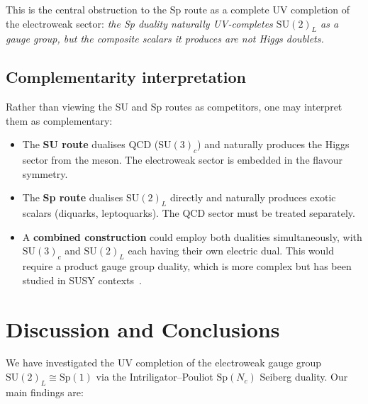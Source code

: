 \documentclass[11pt,a4paper]{article}
\theoremstyle{plain}
\theoremstyle{definition}
\theoremstyle{remark}
\newcommand{\Nc}{N_{\!c}}
\newcommand{\SU}[1]{\mathrm{SU}(#1)}
\newcommand{\Sp}[1]{\mathrm{Sp}(#1)}
\begin{document}
This is the central obstruction to the Sp route as a complete
UV completion of the electroweak sector: \emph{the Sp duality
naturally UV-completes $\SU{2}_L$ as a gauge group, but the
composite scalars it produces are not Higgs doublets.}

\subsection{Complementarity interpretation}

Rather than viewing the SU and Sp routes as competitors, one may
interpret them as complementary:
\begin{itemize}
  \item The \textbf{SU route} dualises QCD ($\SU{3}_c$) and
    naturally produces the Higgs sector from the meson.  The
    electroweak sector is embedded in the flavour symmetry.
  \item The \textbf{Sp route} dualises $\SU{2}_L$ directly and
    naturally produces exotic scalars (diquarks, leptoquarks).
    The QCD sector must be treated separately.
  \item A \textbf{combined construction} could employ both dualities
    simultaneously, with $\SU{3}_c$ and $\SU{2}_L$ each having their
    own electric dual.  This would require a product gauge group
    duality, which is more complex but has been studied in SUSY
    contexts~\cite{IS1995}.
\end{itemize}


\section{Discussion and Conclusions}
\label{sec:conclusions}

We have investigated the UV completion of the electroweak gauge group
$\SU{2}_L \cong \Sp{1}$ via the Intriligator--Pouliot $\Sp{\Nc}$
Seiberg duality.  Our main findings are:
\end{document}
